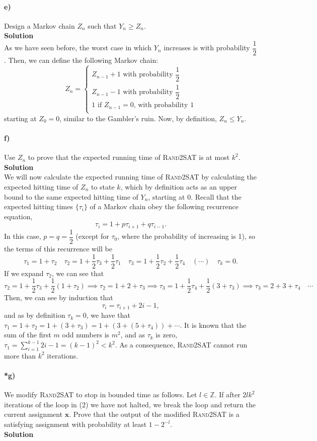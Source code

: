 \documentclass[10pt]{article}
\newcommand{\half}{\dfrac{1}{2}}
\begin{document}
\paragraph{e)} Design a Markov chain $Z_n$ such that $Y_n\geq Z_n$.\\ %
\textbf{Solution}\\
As we have seen before, the worst case in which $Y_n$ increases is with probability $\half$. Then, we can define the following Markov chain:
\[
Z_n=
\begin{cases}
Z_{n-1}+1\text{ with probability }\half\\
Z_{n-1}-1\text{ with probability }\half\\
1\text{ if }Z_{n-1}=0\text{, with probability 1}\\
\end{cases}
\]
starting at $Z_0=0$, similar to the Gambler's ruin. Now, by definition, $Z_n\leq Y_n$.

\paragraph{f)} Use $Z_n$ to prove that the expected running time of \textsc{Rand2SAT} is at most $k^2$.\\
\textbf{Solution}\\
We will now calculate the expected running time of \textsc{Rand2SAT} by calculating the expected hitting time of $Z_n$ to state $k$, which by definition acts as an upper bound to the same expected hitting time of $Y_n$, starting at 0. Recall that the expected hitting times $\{\tau_i\}$ of a Markov chain obey the following recurrence equation,
\[
\tau_i=1+p\tau_{i+1}+q\tau_{i-1}.
\]
In this case, $p=q=\half$ (except for $\tau_0$, where the probability of increasing is 1), so the terms of this recurrence will be
\[
\tau_1=1+\tau_2\quad\tau_2=1+\half\tau_3+\half\tau_1\quad\tau_3=1+\half\tau_2+\half\tau_4\quad (\cdots)\quad \tau_k=0.
\]
If we expand $\tau_2$, we can see that
\[
\tau_2=1+\half\tau_3+\half(1+\tau_2)\implies\tau_2=1+2+\tau_3\implies\tau_3=1+\half\tau_4+\half(3+\tau_3)\implies\tau_3=2+3+\tau_4\quad\cdots
\]
Then, we can see by induction that
\[
\tau_i=\tau_{i+1}+2i-1,
\]
and as by definition $\tau_k=0$, we have that $\tau_1=1+\tau_2=1+(3+\tau_3)=1+(3+(5+\tau_4))+\cdots$. It is known that the sum of the first $m$ odd numbers is $m^2$, and as $\tau_k$ is zero, $\tau_1=\sum_{i=1}^{k-1} 2i-1=(k-1)^2<k^2$. As a consequence, \textsc{Rand2SAT} cannot run more than $k^2$ iterations.

\paragraph{*g)} We modify \textsc{Rand2SAT} to stop in bounded time as follows. Let $l\in\mathbb{Z}$. If after $2lk^2$ iterations of the loop in (2) we have not halted, we break the loop and return the current assignment $\textbf{x}$. Prove that the output of the modified \textsc{Rand2SAT} is a satisfying assignment with probability at least $1-2^{-l}$.\\ %
\textbf{Solution}\\
\end{document}
